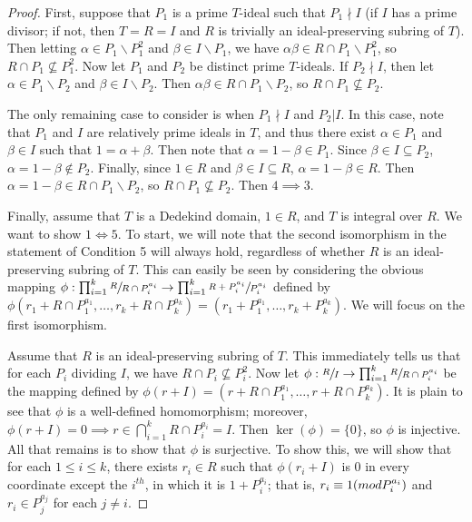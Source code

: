 \documentclass[10pt,a4paper]{amsart}
\newcommand{\modulo}[1]{\textup{ (mod }#1)}
\newcommand{\quot}[2]{\large\sfrac{#1}{#2}\normalsize}
\begin{document}
\begin{proof}
		First, suppose that $P_1$ is a prime $T$-ideal such that $P_1\nmid I$ (if $I$ has a prime divisor; if not, then $T=R=I$ and $R$ is trivially an ideal-preserving subring of $T$). Then letting $\alpha\in P_1\backslash P_1^2$ and $\beta\in I\backslash P_1$, we have $\alpha\beta\in R\cap P_1\backslash P_1^2$, so $R\cap P_1\nsubseteq P_1^2$. Now let $P_1$ and $P_2$ be distinct prime $T$-ideals. If $P_2\nmid I$, then let $\alpha\in P_1\backslash P_2$ and $\beta\in I\backslash P_2$. Then $\alpha\beta\in R\cap P_1\backslash P_2$, so $R\cap P_1\nsubseteq P_2$. 
		
		The only remaining case to consider is when $P_1\nmid I$ and $P_2|I$. In this case, note that $P_1$ and $I$ are relatively prime ideals in $T$, and thus there exist $\alpha\in P_1$ and $\beta\in I$ such that $1=\alpha+\beta$. Then note that $\alpha=1-\beta\in P_1$. Since $\beta\in I\subseteq P_2$, $\alpha=1-\beta\notin P_2$. Finally, since $1\in R$ and $\beta\in I\subseteq R$, $\alpha=1-\beta\in R$. Then $\alpha=1-\beta\in R\cap P_1\backslash P_2$, so $R\cap P_1\nsubseteq P_2$. Then $4\implies 3$.
		
		Finally, assume that $T$ is a Dedekind domain, $1\in R$, and $T$ is integral over $R$. We want to show $1\iff 5$. To start, we will note that the second isomorphism in the statement of Condition 5 will always hold, regardless of whether $R$ is an ideal-preserving subring of $T$. This can easily be seen by considering the obvious mapping $\phi:\prod_{i=1}^k\quot{R}{R\cap P_i^{a_i}}\to \prod_{i=1}^k\quot{R+P_i^{a_i}}{P_i^{a_i}}$ defined by $\phi(r_1+R\cap P_1^{a_1},\dots,r_k+R\cap P_k^{a_k})=(r_1+P_1^{a_1},\dots,r_k+P_k^{a_k})$. We will focus on the first isomorphism.
		
		Assume that $R$ is an ideal-preserving subring of $T$. This immediately tells us that for each $P_i$ dividing $I$, we have $R\cap P_i\nsubseteq P_i^2$. Now let $\phi:\quot{R}{I}\to \prod_{i=1}^k\quot{R}{R\cap P_i^{a_i}}$ be the mapping defined by $\phi(r+I)=(r+R\cap P_1^{a_1},\dots,r+R\cap P_k^{a_k})$. It is plain to see that $\phi$ is a well-defined homomorphism; moreover, $\phi(r+I)=0\implies r\in \bigcap_{i=1}^k R\cap P_i^{a_i}=I$. Then $\ker(\phi)=\{0\}$, so $\phi$ is injective. All that remains is to show that $\phi$ is surjective. To show this, we will show that for each $1\leq i\leq k$, there exists $r_i\in R$ such that $\phi(r_i+I)$ is 0 in every coordinate except the $i^{th}$, in which it is $1+P_i^{a_i}$; that is, $r_i\equiv 1\modulo{P_i^{a_i}}$ and $r_i\in P_j^{a_j}$ for each $j\neq i$.
		

\end{proof}
\end{document}
